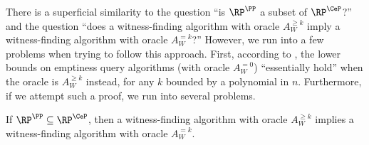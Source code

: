 \documentclass{article}
\begin{document}
There is a superficial similarity to the question ``is $\RP^\PP$ a subset of $\RP^{\CeP}$?'' and the question ``does a witness-finding algorithm with oracle $A^{\geq k}_W$ imply a witness-finding algorithm with oracle $A^{= k}_W$?''
However, we run into a few problems when trying to follow this approach.
First, according to \autocite[Remark~2]{krw12}, the lower bounds on emptiness query algorithms (with oracle $A^{=0}_W$) ``essentially hold'' when the oracle is $A^{\geq k}_W$ instead, for any $k$ bounded by a polynomial in $n$.
Furthermore, if we attempt such a proof, we run into several problems.

\begin{conjecture}
  If $\RP^\PP \subseteq \RP^{\CeP}$, then a witness-finding algorithm with oracle $A^{\geq k}_W$ implies a witness-finding algorithm with oracle $A^{= k}_W$.
\end{conjecture}
\end{document}
